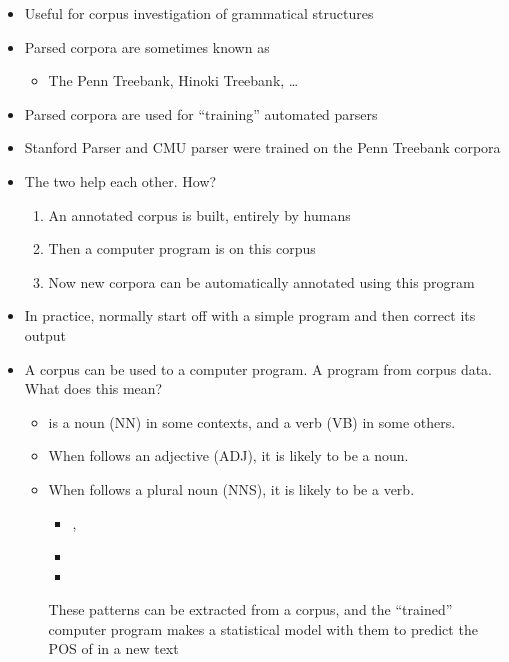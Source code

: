 \documentclass[a4paper,landscape,headrule,footrule,dvips]{foils}
\begin{document}
\begin{CJK}{UTF8}{min}
\begin{itemize}
\item  Useful for corpus investigation of grammatical structures
\item  Parsed corpora are sometimes known as 
  \begin{itemize}
  \item The Penn Treebank, Hinoki Treebank, \ldots
  \end{itemize}
\item  Parsed corpora are used for ``training'' automated parsers
\item  Stanford Parser and CMU parser were trained on the Penn Treebank corpora
\end{itemize}


\begin{itemize}
\item  The two help each other. How?
  \begin{enumerate}
  \item An annotated corpus is built, entirely by humans
  \item Then a computer program is  on this corpus
  \item Now new corpora can be automatically annotated using this program
  \end{enumerate}
\item In practice, normally start off with a simple program and then correct its output
\end{itemize}
\begin{itemize}
\item  A corpus can be used to  a computer program. A program
 from corpus data. What does this mean?
\begin{itemize}
\item {} is a noun (NN) in some contexts, and a verb (VB) in some others.
\item When  follows an adjective (ADJ), it is likely to be a noun.
\item When  follows a plural noun (NNS), it is likely to be a verb.
  \begin{itemize}
  \item  {}, 
  \item  {}
  \item {} 
  \end{itemize}
  These patterns can be extracted from a corpus, and the ``trained''
  computer program makes a statistical model with them to predict the
  POS of  in a new text
\end{itemize}
\end{itemize}


\end{CJK}
\end{document}
